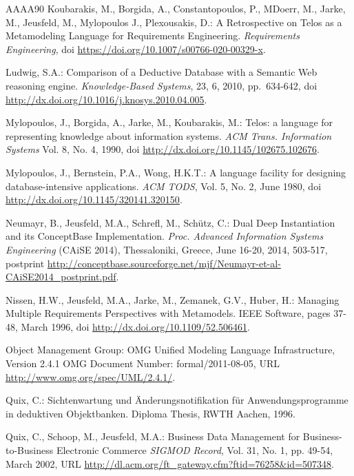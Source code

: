 \begin{thebibliography}{AAAA90}
  Koubarakis, M., Borgida, A., Constantopoulos, P., MDoerr, M., Jarke, M., Jeusfeld, M., Mylopoulos J., Plexousakis, D.:
 A Retrospective on Telos as a Metamodeling Language for Requirements Engineering.
{\em Requirements Engineering}, 
doi \url{https://doi.org/10.1007/s00766-020-00329-x}.

 Ludwig, S.A.:
Comparison of a Deductive Database with a Semantic Web reasoning engine.
{\em Knowledge-Based Systems}, 23, 6, 2010, pp.\ 634-642,
doi \url{http://dx.doi.org/10.1016/j.knosys.2010.04.005}.


 Mylopoulos, J., Borgida, A., Jarke, M., Koubarakis, M.:
Telos: a language for representing knowledge about
information systems. {\it ACM Trans. Information Systems\/} Vol. 8, No. 4, 1990,
doi \url{http://dx.doi.org/10.1145/102675.102676}.


 Mylopoulos, J., Bernstein, P.A., Wong, H.K.T.:
A language facility for designing database-intensive applications.
{\em ACM TODS}, Vol. 5, No. 2, June 1980,
doi \url{http://dx.doi.org/10.1145/320141.320150}.


 Neumayr, B., Jeusfeld, M.A., Schrefl, M., Sch{\"u}tz, C.:
 Dual Deep Instantiation and its ConceptBase Implementation.
{\em Proc. Advanced Information Systems Engineering} (CAiSE 2014), Thessaloniki, Greece, June 16-20, 2014, 503-517,
postprint \url{http://conceptbase.sourceforge.net/mjf/Neumayr-et-al-CAiSE2014_postprint.pdf}.

 Nissen, H.W., Jeusfeld, M.A., Jarke, M., Zemanek, G.V., Huber, H.:
Managing Multiple Requirements Perspectives with Metamodels.
IEEE Software, pages 37-48, March 1996,
doi \url{http://dx.doi.org/10.1109/52.506461}.


 Object Management Group:
OMG Unified Modeling Language Infrastructure, Version 2.4.1
OMG Document Number: formal/2011-08-05,
URL \url{http://www.omg.org/spec/UML/2.4.1/}.


 Quix, C.:
Sichtenwartung und \"Anderungsnotifikation f\"ur Anwendungsprogramme in
deduktiven Objektbanken. Diploma Thesis, RWTH Aachen, 1996.

 Quix, C., Schoop, M., Jeusfeld, M.A.:
Business Data Management for Business-to-Business Electronic Commerce
{\em SIGMOD Record}, Vol. 31, No. 1, pp. 49-54, March 2002,
URL \url{http://dl.acm.org/ft_gateway.cfm?ftid=76258&id=507348}.



\end{thebibliography}

